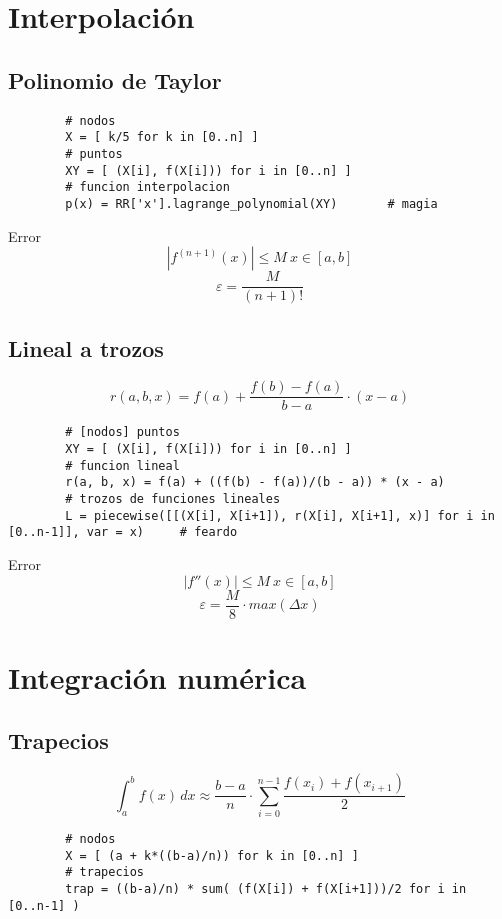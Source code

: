 \documentclass{article}
\begin{document}
	\section{Interpolación}

	\subsection{Polinomio de Taylor}
	
	\begin{verbatim}
		# nodos
		X = [ k/5 for k in [0..n] ]
		# puntos
		XY = [ (X[i], f(X[i])) for i in [0..n] ]
		# funcion interpolacion
		p(x) = RR['x'].lagrange_polynomial(XY)       # magia
	\end{verbatim}

	Error
	$$
		|f^{(n+1)}(x)| \le M \ x \in [a, b]
	$$
	$$
		\varepsilon = \frac{M}{(n+1)!}
	$$
	
	\subsection{Lineal a trozos}
	
	$$
		r(a, b, x) = f(a) + \frac{f(b) - f(a)}{b - a} \cdot (x - a)
	$$
	
	\begin{verbatim}
		# [nodos] puntos
		XY = [ (X[i], f(X[i])) for i in [0..n] ]
		# funcion lineal
		r(a, b, x) = f(a) + ((f(b) - f(a))/(b - a)) * (x - a)
		# trozos de funciones lineales
		L = piecewise([[(X[i], X[i+1]), r(X[i], X[i+1], x)] for i in [0..n-1]], var = x)     # feardo
	\end{verbatim}
	
	Error
	$$
		|f''(x)| \le M \ x \in [a, b]
	$$
	$$
		\varepsilon = \frac{M}{8} \cdot max(\Delta x)
	$$
	
	\section{Integración numérica}
	
	\subsection{Trapecios}
	
	$$
		\int_a^b f(x) \, dx \approx \frac{b-a}{n} \cdot \sum_{i=0}^{n-1} \frac{f(x_i) + f(x_{i+1})}{2}
	$$
	
	\begin{verbatim}
		# nodos
		X = [ (a + k*((b-a)/n)) for k in [0..n] ]
		# trapecios
		trap = ((b-a)/n) * sum( (f(X[i]) + f(X[i+1]))/2 for i in [0..n-1] )
	\end{verbatim}
\end{document}
